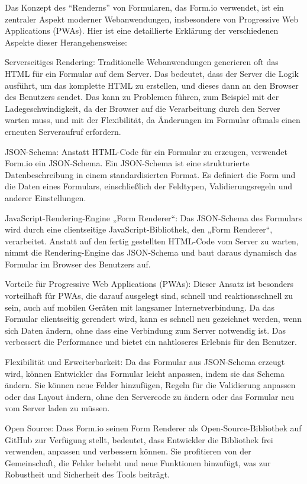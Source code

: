 Das Konzept des ``Renderns'' von Formularen, das Form.io verwendet, ist ein zentraler Aspekt moderner Webanwendungen, insbesondere von Progressive Web Applications (PWAs). Hier ist eine detaillierte Erklärung der verschiedenen Aspekte dieser Herangehensweise:

Serverseitiges Rendering: Traditionelle Webanwendungen generieren oft das HTML für ein Formular auf dem Server. Das bedeutet, dass der Server die Logik ausführt, um das komplette HTML zu erstellen, und dieses dann an den Browser des Benutzers sendet. Das kann zu Problemen führen, zum Beispiel mit der Ladegeschwindigkeit, da der Browser auf die Verarbeitung durch den Server warten muss, und mit der Flexibilität, da Änderungen im Formular oftmals einen erneuten Serveraufruf erfordern.

JSON-Schema: Anstatt HTML-Code für ein Formular zu erzeugen, verwendet Form.io ein JSON-Schema. Ein JSON-Schema ist eine strukturierte Datenbeschreibung in einem standardisierten Format. Es definiert die Form und die Daten eines Formulars, einschließlich der Feldtypen, Validierungsregeln und anderer Einstellungen.

JavaScript-Rendering-Engine „Form Renderer“: Das JSON-Schema des Formulars wird durch eine clientseitige JavaScript-Bibliothek, den „Form Renderer“, verarbeitet. Anstatt auf den fertig gestellten HTML-Code vom Server zu warten, nimmt die Rendering-Engine das JSON-Schema und baut daraus dynamisch das Formular im Browser des Benutzers auf.

Vorteile für Progressive Web Applications (PWAs): Dieser Ansatz ist besonders vorteilhaft für PWAs, die darauf ausgelegt sind, schnell und reaktionsschnell zu sein, auch auf mobilen Geräten mit langsamer Internetverbindung. Da das Formular clientseitig gerendert wird, kann es schnell neu gezeichnet werden, wenn sich Daten ändern, ohne dass eine Verbindung zum Server notwendig ist. Das verbessert die Performance und bietet ein nahtloseres Erlebnis für den Benutzer.

Flexibilität und Erweiterbarkeit: Da das Formular aus JSON-Schema erzeugt wird, können Entwickler das Formular leicht anpassen, indem sie das Schema ändern. Sie können neue Felder hinzufügen, Regeln für die Validierung anpassen oder das Layout ändern, ohne den Servercode zu ändern oder das Formular neu vom Server laden zu müssen.

Open Source: Dass Form.io seinen Form Renderer als Open-Source-Bibliothek auf GitHub zur Verfügung stellt, bedeutet, dass Entwickler die Bibliothek frei verwenden, anpassen und verbessern können. Sie profitieren von der Gemeinschaft, die Fehler behebt und neue Funktionen hinzufügt, was zur Robustheit und Sicherheit des Tools beiträgt.

